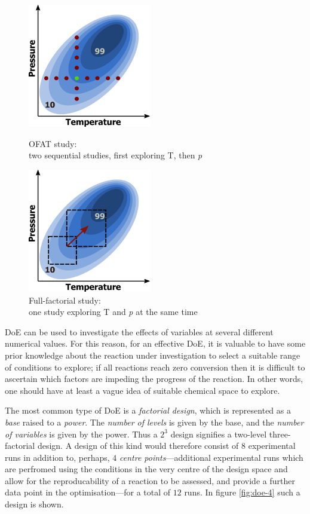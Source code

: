 \begin{figure}
\centering
\begin{minipage}{0.45\textwidth}
   \centering
   \includegraphics[height=5.4cm]{gfx/doe-1} %
   \caption{OFAT study:\\two sequential studies, first exploring T, then \textit{p}}
   \label{fig:doe-1}
\end{minipage}\hfill
\begin{minipage}{0.45\textwidth}
   \centering
   \includegraphics[height=5.4cm]{gfx/doe-2} %
   \caption{Full-factorial study:\\one study exploring T and \textit{p} at the same time}
   \label{fig:doe-2}
\end{minipage}
\end{figure}

DoE can be used to investigate the effects of variables at several different numerical values. For this reason, for an effective DoE, it is valuable to have some prior knowledge about the reaction under investigation to select a suitable range of conditions to explore; if all reactions reach zero conversion then it is difficult to ascertain which factors are impeding the progress of the reaction. In other words, one should have at least a vague idea of suitable chemical space to explore.

The most common type of DoE is a \textit{factorial design}, which is represented as a \textit{base} raised to a \textit{power}. The \textit{number of levels} is given by the base, and the \textit{number of variables} is given by the power. Thus a $2^3$ design signifies a two-level three-factorial design. A design of this kind would therefore consist of $8$ experimental runs in addition to, perhaps, $4$ \textit{centre points}---additional experimental runs which are perfromed using the conditions in the very centre of the design space and allow for the reproducability of a reaction to be assessed, and provide a further data point in the optimisation---for a total of $12$ runs. In figure \ref{fig:doe-4} such a design is shown.

